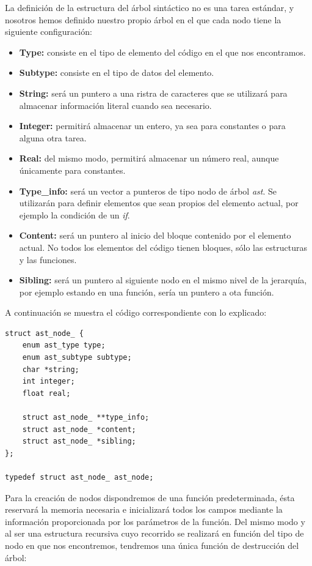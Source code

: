 \documentclass[a4paper,10pt]{article}
\begin{document}
La definición de la estructura del árbol sintáctico no es una tarea estándar, y nosotros hemos definido nuestro propio árbol en el que cada nodo tiene la siguiente configuración:
\begin{itemize}
	\item \textbf{Type:} consiste en el tipo de elemento del código en el que nos encontramos.
	\item \textbf{Subtype:} consiste en el tipo de datos del elemento.
	\item \textbf{String:} será un puntero a una ristra de caracteres que se utilizará para almacenar información literal cuando sea necesario.
	\item \textbf{Integer:} permitirá almacenar un entero, ya sea para constantes o para alguna otra tarea.
	\item \textbf{Real:} del mismo modo, permitirá almacenar un número real, aunque únicamente para constantes.
	
	\item \textbf{Type\_info:} será un vector a punteros de tipo nodo de árbol \textit{ast}. Se utilizarán para definir elementos que sean propios del elemento actual, por ejemplo la condición de un \textit{if}.
	
	\item \textbf{Content:} será un puntero al inicio del bloque contenido por el elemento actual. No todos los elementos del código tienen bloques, sólo las estructuras y las funciones.
	
	\item \textbf{Sibling:} será un puntero al siguiente nodo en el mismo nivel de la jerarquía, por ejemplo estando en una función, sería un puntero a ota función.
	
\end{itemize}

A continuación se muestra el código correspondiente con lo explicado:
\begin{lstlisting}
struct ast_node_ {
	enum ast_type type;
	enum ast_subtype subtype;
	char *string;
	int integer;
	float real;

	struct ast_node_ **type_info;
	struct ast_node_ *content;
	struct ast_node_ *sibling;
};

typedef struct ast_node_ ast_node;
\end{lstlisting}


Para la creación de nodos dispondremos de una función predeterminada, ésta reservará la memoria necesaria e inicializará todos los campos mediante la información proporcionada por los parámetros de la función. Del mismo modo y al ser una estructura recursiva cuyo recorrido se realizará en función del tipo de nodo en que nos encontremos, tendremos una única función de destrucción del árbol:
\end{document}
